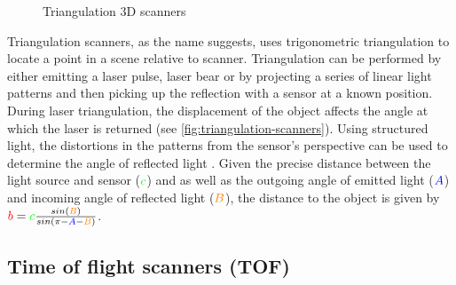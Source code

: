 \begin{figure}[H]
\begin{subfigure}[b]{.33\textwidth}
	\end{subfigure}
	\caption{Triangulation 3D scanners \protect\footnotemark}
	\label{fig:triangulation-scanners}
\end{figure}

Triangulation scanners, as the name suggests, uses trigonometric triangulation \cite{Frohlich2004} to locate a point in a scene relative to scanner. Triangulation can be performed by either emitting a laser pulse, laser bear or by projecting a series of linear light patterns and then picking up the reflection with a sensor at a known position. During laser triangulation, the displacement of the object affects the angle at which the laser is returned (see \autoref{fig:triangulation-scanners}). Using structured light, the distortions in the patterns from the sensor's perspective can be used to determine the angle of reflected light \cite{Brown2012}. Given the precise distance between the light source and sensor ($\begingroup\color{green}c\endgroup$) and as well as the outgoing angle of emitted light ($\begingroup\color{blue}A\endgroup$) and incoming angle of reflected light ($\begingroup\color{orange}B\endgroup$), the distance to the object is given by $\begingroup\color{red}b\endgroup = \begingroup\color{green}c\endgroup\frac{ sin(\begingroup\color{orange}B\endgroup)}{sin(\pi - \begingroup\color{blue}A\endgroup-\begingroup\color{orange}B\endgroup)}$.

\subsection{Time of flight scanners (TOF)}


